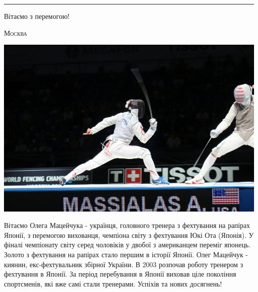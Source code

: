 \documentclass[10pt,a4paper]{article}
\newcommand{\SepRule}{\noindent							 %
						\begin{center}
							\rule{250pt}{1pt}
						\end{center}
						}
\newcommand{\NewsItem}[1]{%
		\usefont{T2A}{iwona}{m}{n} 
		\large #1 \vspace{4pt}
		\par \normalsize \normalfont}
\newcommand{\NewsAuthor}[1]{%
			\hfill \textsc{#1} \vspace{4pt}
			\par \normalfont}
\begin{document}
\vspace{0.5cm}
	\SepRule
\vspace{0.5cm}
\begin{multicols}{3}
	\NewsItem{Вітаємо з перемогою!}
	\NewsAuthor{Москва}
		\begin{center}
			\includegraphics[width=0.8\linewidth]{images/rapiry}
		\end{center}
Вітаємо Олега Мацейчука - українця, головного тренера з фехтування на рапірах Японії, з перемогою вихованця, чемпіона світу з фехтування Юкі Ота (Японія). 
У фіналі чемпіонату світу серед чоловіків у двобої з американцем переміг японець. Золото з фехтування на рапірах стало першим в історії Японії.
Олег Мацейчук - киянин, екс-фехтувальник збірної України. В 2003 розпочав роботу тренером з фехтування в Японії. За період перебування в Японії виховав ціле покоління спортсменів, які вже самі стали тренерами.
Успіхів та нових досягнень!


\end{multicols}
\end{document}

